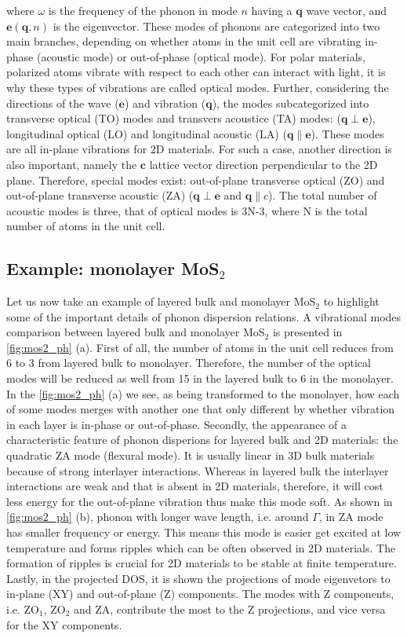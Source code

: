where $\omega$ is the frequency of the phonon in mode $n$ having a $\mathbf{q}$ wave vector, and $\mathbf{e}(\mathbf{q},n)$ is the eigenvector\cite{Ackland1997,Parlinski2011}.  These modes of phonons are categorized into two main branches, depending on whether atoms in the unit cell are vibrating in-phase (acoustic mode) or out-of-phase (optical mode). For polar materials, polarized atoms vibrate with respect to each other can interact with light, it is why these types of vibrations are called optical modes. Further, considering the directions of the wave ($\mathbf{e}$) and vibration ($\mathbf{q}$), the modes subcategorized into transverse optical (TO) modes and transvers acoustice (TA) modes: ($\mathbf{q} \perp \mathbf{e}$), longitudinal optical (LO) and longitudinal acoustic (LA) ($\mathbf{q} \parallel \mathbf{e}$). These modes are all in-plane vibrations for 2D materials. For such a case, another direction is also important, namely the $\mathbf{c}$ lattice vector direction perpendicular to the 2D plane. Therefore, special modes exist: out-of-plane transverse optical (ZO) and out-of-plane transverse acoustic (ZA) ($\mathbf{q} \perp \mathbf{e}$ and $\mathbf{q} \parallel c$). The total number of acoustic modes is three, that of optical modes is 3N-3, where N is the total number of atoms in the unit cell. 


\subsection{Example: monolayer MoS$_2$}

Let us now take an example of layered bulk and monolayer MoS$_2$ to highlight some of the important details of phonon dispersion relations. A vibrational modes comparison between layered bulk and monolayer MoS$_2$ is presented in \autoref{fig:mos2_ph} (a). First of all, the number of atoms in the unit cell reduces from 6 to 3 from layered bulk to monolayer. Therefore, the number of the optical modes will be reduced as well from 15 in the layered bulk to 6 in the monolayer. In the \autoref{fig:mos2_ph} (a) we see, as being transformed to the monolayer, how each of some modes merges with another one that only different by whether vibration in each layer is in-phase or out-of-phase. Secondly, the appearance of a characteristic feature of phonon disperions for layered bulk and 2D materials: the quadratic ZA mode (flexural mode). It is usually linear in 3D bulk materials because of strong interlayer interactions. Whereas in layered bulk the interlayer interactions are weak and that is absent in 2D materials, therefore, it will cost less energy for the out-of-plane vibration thus make this mode soft. As shown in \autoref{fig:mos2_ph} (b), phonon with longer wave length, i.e. around $\Gamma$, in ZA mode has smaller frequency or energy. This means this mode is easier get excited at low temperature and forms ripples which can be often observed in 2D materials. The formation of ripples is crucial for 2D materials to be stable at finite temperature. Lastly, in the projected DOS, it is shown the projections of mode eigenvetors to in-plane (XY) and out-of-plane (Z) components. The modes with Z components, i.e. ZO$_1$, ZO$_2$ and ZA, contribute the most to the Z projections, and vice versa for the XY components. 

